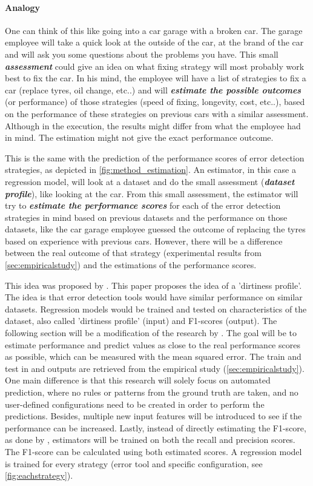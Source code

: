 \newpage
\paragraph{Analogy} One can think of this like going into a car garage with a broken car. The garage employee will take a quick look at the outside of the car, at the brand of the car and will ask you some questions about the problems you have. This small \textit{\textbf{assessment}} could give an idea on what fixing strategy will most probably work best to fix the car. In his mind, the employee will have a list of strategies to fix a car (replace tyres, oil change, etc..) and will \textbf{\textit{estimate the possible outcomes}} (or performance) of those strategies (speed of fixing, longevity, cost, etc..), based on the performance of these strategies on previous cars with a similar assessment. Although in the execution, the results might differ from what the employee had in mind. The estimation might not give the exact performance outcome.

This is the same with the prediction of the performance scores of error detection strategies, as depicted in \autoref{fig:method_estimation}. An estimator, in this case a regression model, will look at a dataset and do the small assessment (\textbf{\textit{dataset profile}}), like looking at the car. From this small assessment, the estimator will try to \textbf{\textit{estimate the performance scores}} for each of the error detection strategies in mind based on previous datasets and the performance on those datasets, like the car garage employee guessed the outcome of replacing the tyres based on experience with previous cars. However, there will be a difference between the real outcome of that strategy (experimental results from \autoref{sec:empiricalstudy}) and the estimations of the performance scores. 

This idea was proposed by \cite{Mahdavi2019-pk}. This paper proposes the idea of a 'dirtiness profile'. The idea is that error detection tools would have similar performance on similar datasets. Regression models would be trained and tested on characteristics of the dataset, also called 'dirtiness profile' (input) and F1-scores (output). The following section will be a modification of the research by \cite{Mahdavi2019-pk}. 
The goal will be to estimate performance and predict values as close to the real performance scores as possible, which can be measured with the mean squared error.
The train and test in and outputs are retrieved from the empirical study (\autoref{sec:empiricalstudy}). One main difference is that this research will solely focus on automated prediction, where no rules or patterns from the ground truth are taken, and no user-defined configurations need to be created in order to perform the predictions. Besides, multiple new input features will be introduced to see if the performance can be increased. Lastly, instead of directly estimating the F1-score, as done by \cite{Mahdavi2019-pk}, estimators will be trained on both the recall and precision scores. The F1-score can be calculated using both estimated scores.
A regression model is trained for every strategy (error tool and specific configuration, see \autoref{fig:eachstrategy}). 

